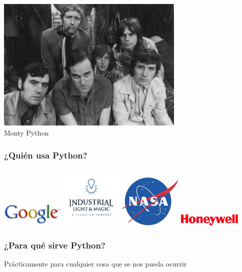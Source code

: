 \documentclass{beamer}
\begin{document}
\begin{frame}
 \begin{center}
 \includegraphics[width=9cm]{files/python.jpg}\\
Monty Python
\end{center}

\end{frame}

\begin{frame}
 \frametitle{¿Quién usa Python?}

\begin{center}
 \includegraphics[width=3cm]{files/google.jpg}
 \includegraphics[width=3cm]{files/Industrial_Light_and_Magic.jpg}
 \includegraphics[width=3cm]{files/NASA_Logo.jpg}
 \includegraphics[width=3cm]{files/honeywell_logo.jpg}
\end{center}
\end{frame}

\begin{frame}
 \frametitle{¿Para qué sirve Python?}
 \begin{center}
 Prácticamente para cualquier cosa que se nos pueda ocurrir
 \end{center}

\end{frame}
\end{document}
